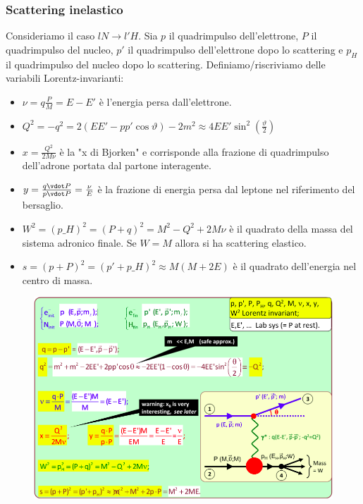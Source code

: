 \subsubsection{Scattering inelastico}
Consideriamo il caso $lN\to l'H$. Sia $p$ il quadrimpulso dell'elettrone, $P$ il quadrimpulso del nucleo, $p'$ il quadrimpulso dell'elettrone dopo lo scattering e $p_H$ il quadrimpulso del nucleo dopo lo scattering. Definiamo/riscriviamo delle variabili Lorentz-invarianti:
\begin{itemize}
    \item $\nu=q\frac PM=E-E'$ è l'energia persa dall'elettrone.
    \item $Q^2=-q^2=2(EE'-pp'\cos\vartheta)-2m^2\approx4EE'\sin^2(\frac\vartheta2)$ 
    \item $x=\frac{Q^2}{2M\nu}$ è la "x di Bjorken" e corrisponde alla frazione di quadrimpulso dell'adrone portata dal partone interagente.
    \item $y=\frac{q\vdot P}{p\vdot P}=\frac\nu E$ è la frazione di energia persa dal leptone nel riferimento del bersaglio.
    \item $W^2=(p\_H)^2=(P+q)^2=M^2-Q^2+2M\nu$ è il quadrato della massa del sistema adronico finale. Se $W=M$ allora si ha scattering elastico.
    \item $s=(p+P)^2=(p'+p\_H)^2\approx M(M+2E)$ è il quadrato dell'energia nel centro di massa.
\end{itemize}
\begin{figure}[H]
    \centering
    \includegraphics[width=\textwidth]{immagini/fig_conti_kinem.png}
\end{figure}
